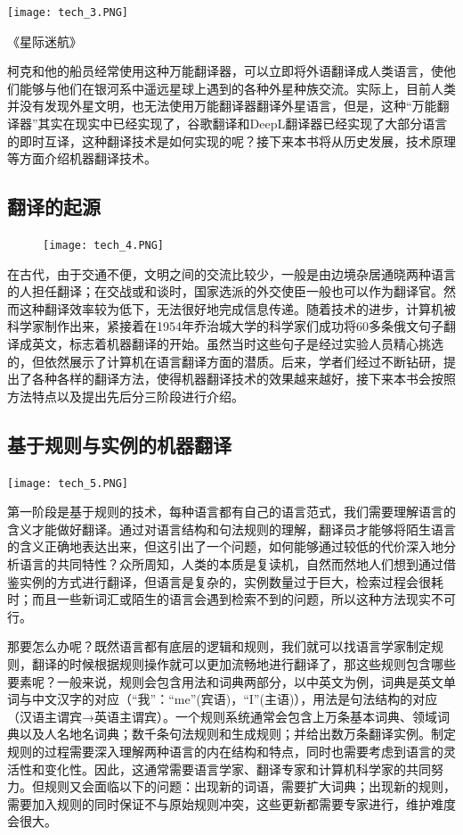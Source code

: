 \begin{marginfigure}[-5.5cm]
	\texttt{[image: tech\_3.PNG]}
	\caption[《星际迷航》]{《星际迷航》}
\end{marginfigure}

柯克和他的船员经常使用这种万能翻译器，可以立即将外语翻译成人类语言，使他们能够与他们在银河系中遥远星球上遇到的各种外星种族交流。实际上，目前人类并没有发现外星文明，也无法使用万能翻译器翻译外星语言，但是，这种“万能翻译器”其实在现实中已经实现了，谷歌翻译和DeepL翻译器已经实现了大部分语言的即时互译，这种翻译技术是如何实现的呢？接下来本书将从历史发展，技术原理等方面介绍机器翻译技术。

\subsection{翻译的起源}

\begin{figure}[htbp]
	\hspace{11cm}\texttt{[image: tech\_4.PNG]}
\end{figure}
在古代，由于交通不便，文明之间的交流比较少，一般是由边境杂居通晓两种语言的人担任翻译；在交战或和谈时，国家选派的外交使臣一般也可以作为翻译官。然而这种翻译效率较为低下，无法很好地完成信息传递。随着技术的进步，计算机被科学家制作出来，紧接着在1954年乔治城大学的科学家们成功将60多条俄文句子翻译成英文，标志着机器翻译的开始。虽然当时这些句子是经过实验人员精心挑选的，但依然展示了计算机在语言翻译方面的潜质。后来，学者们经过不断钻研，提出了各种各样的翻译方法，使得机器翻译技术的效果越来越好，接下来本书会按照方法特点以及提出先后分三阶段进行介绍。

\subsection{基于规则与实例的机器翻译}
\begin{marginfigure}
    \texttt{[image: tech\_5.PNG]}
\end{marginfigure}
第一阶段是基于规则的技术，每种语言都有自己的语言范式，我们需要理解语言的含义才能做好翻译。通过对语言结构和句法规则的理解，翻译员才能够将陌生语言的含义正确地表达出来，但这引出了一个问题，如何能够通过较低的代价深入地分析语言的共同特性？众所周知，人类的本质是复读机，自然而然地人们想到通过借鉴实例的方式进行翻译，但语言是复杂的，实例数量过于巨大，检索过程会很耗时；而且一些新词汇或陌生的语言会遇到检索不到的问题，所以这种方法现实不可行。

那要怎么办呢？既然语言都有底层的逻辑和规则，我们就可以找语言学家制定规则，翻译的时候根据规则操作就可以更加流畅地进行翻译了，那这些规则包含哪些要素呢？一般来说，规则会包含用法和词典两部分，以中英文为例，词典是英文单词与中文汉字的对应（“我”：“me”(宾语)，“I”(主语)），用法是句法结构的对应（汉语主谓宾→英语主谓宾）。一个规则系统通常会包含上万条基本词典、领域词典以及人名地名词典；数千条句法规则和生成规则；并给出数万条翻译实例。制定规则的过程需要深入理解两种语言的内在结构和特点，同时也需要考虑到语言的灵活性和变化性。因此，这通常需要语言学家、翻译专家和计算机科学家的共同努力。但规则又会面临以下的问题：出现新的词语，需要扩大词典；出现新的规则，需要加入规则的同时保证不与原始规则冲突，这些更新都需要专家进行，维护难度会很大。

